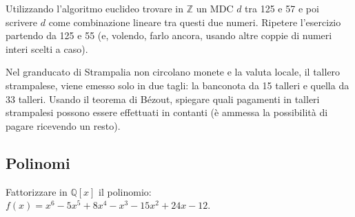 \begin{exsbox}
	Utilizzando l'algoritmo euclideo trovare in $\mathbb{Z}$ un MDC $d$ tra 125 e 57 e poi scrivere $d$ come combinazione lineare tra questi due numeri. Ripetere l'esercizio partendo da 125 e 55 (e, volendo, farlo ancora, usando altre coppie di numeri interi scelti a caso).
\end{exsbox}
\begin{exsbox}
	Nel granducato di Strampalia non circolano monete e la valuta locale, il tallero strampalese, viene emesso solo in due tagli: la banconota da 15 talleri e quella da 33 talleri. Usando il teorema di Bézout, spiegare quali pagamenti in talleri strampalesi possono essere effettuati in contanti (è ammessa la possibilità di pagare ricevendo un resto).
\end{exsbox}

\subsection{Polinomi}
\begin{exsbox}
	Fattorizzare in $\mathbb{Q}[x]$ il polinomio: 	$f(x)=x^{6}-5x^{5}+8x^{4}-x^{3}-15x^{2}+24x-12$.
\end{exsbox}
